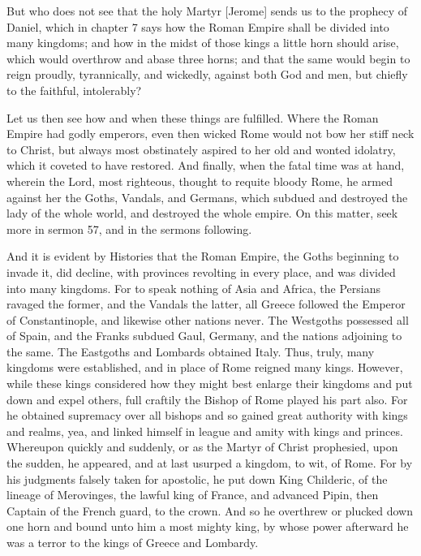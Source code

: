 But who does not see that the holy Martyr [Jerome] sends us to the prophecy of Daniel, which in chapter 7 says how the Roman Empire shall be divided into many kingdoms; and how in the midst of those kings a little horn should arise, which would overthrow and abase three horns; and that the same would begin to reign proudly, tyrannically, and wickedly, against both God and men, but chiefly to the faithful, intolerably?

Let us then see how and when these things are fulfilled. Where the Roman Empire had godly emperors, even then wicked Rome would not bow her stiff neck to Christ, but always most obstinately aspired to her old and wonted idolatry, which it coveted to have restored. And finally, when the fatal time was at hand, wherein the Lord, most righteous, thought to requite bloody Rome, he armed against her the Goths, Vandals, and Germans, which subdued and destroyed the lady of the whole world, and destroyed the whole empire. On this matter, seek more in sermon 57, and in the sermons following.

And it is evident by Histories that the Roman Empire, the Goths beginning to invade it, did decline, with provinces revolting in every place, and was divided into many kingdoms. For to speak nothing of Asia and Africa, the Persians ravaged the former, and the Vandals the latter, all Greece followed the Emperor of Constantinople, and likewise other nations never. The Westgoths possessed all of Spain, and the Franks subdued Gaul, Germany, and the nations adjoining to the same. The Eastgoths and Lombards obtained Italy. Thus, truly, many kingdoms were established, and in place of Rome reigned many kings. However, while these kings considered how they might best enlarge their kingdoms and put down and expel others, full craftily the Bishop of Rome played his part also. For he obtained supremacy over all bishops and so gained great authority with kings and realms, yea, and linked himself in league and amity with kings and princes. Whereupon quickly and suddenly, or as the Martyr of Christ prophesied, upon the sudden, he appeared, and at last usurped a kingdom, to wit, of Rome. For by his judgments falsely taken for apostolic, he put down King Childeric, of the lineage of Merovinges, the lawful king of France, and advanced Pipin, then Captain of the French guard, to the crown. And so he overthrew or plucked down one horn and bound unto him a most mighty king, by whose power afterward he was a terror to the kings of Greece and Lombardy.

